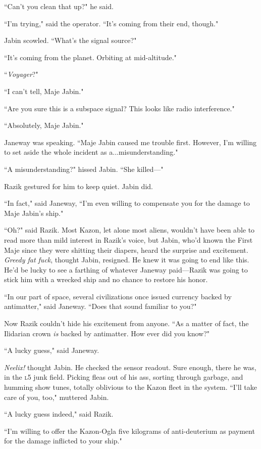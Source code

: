 \documentclass[twoside,letterpaper,12pt]{memoir}
\begin{document}
``Can't you clean that up?" he said.

``I'm trying," said the operator. ``It's coming from their end, though."

Jabin scowled. ``What's the signal source?"

``It's coming from the planet. Orbiting at mid-altitude."

``\textit{Voyager}?"

``I can't tell, Maje Jabin."

``Are you sure this is a subspace signal? This looks like radio interference."

``Absolutely, Maje Jabin."

Janeway was speaking. ``Maje Jabin caused me trouble first. However, I'm willing to set aside the whole incident as a...misunderstanding."

``A misunderstanding?" hissed Jabin. ``She killed---"

Razik gestured for him to keep quiet. Jabin did.

``In fact," said Janeway, ``I'm even willing to compensate you for the damage to Maje Jabin's ship."

``Oh?" said Razik. Most Kazon, let alone most aliens, wouldn't have been able to read more than mild interest in Razik's voice, but Jabin, who'd known the First Maje since they were shitting their diapers, heard the surprise and excitement. \textit{Greedy fat fuck}, thought Jabin, resigned. He knew it was going to end like this. He'd be lucky to see a farthing of whatever Janeway paid---Razik was going to stick him with a wrecked ship and no chance to restore his honor.

``In our part of space, several civilizations once issued currency backed by antimatter," said Janeway. ``Does that sound familiar to you?"

Now Razik couldn't hide his excitement from anyone. ``As a matter of fact, the Ilidarian crown \textit{is} backed by antimatter. How ever did you know?"

``A lucky guess," said Janeway.

\textit{Neelix!} thought Jabin. He checked the sensor readout. Sure enough, there he was, in the \textsc{l5} junk field. Picking fleas out of his ass, sorting through garbage, and humming show tunes, totally oblivious to the Kazon fleet in the system. ``I'll take care of you, too," muttered Jabin.

``A lucky guess indeed," said Razik.

``I'm willing to offer the Kazon-Ogla five kilograms of anti-deuterium as payment for the damage inflicted to your ship."
\end{document}
